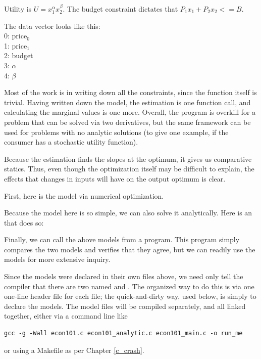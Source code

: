 Utility is $U = x_1^\alpha x_2^\beta$. 
The budget constraint dictates that $P_1 x_1 + P_2 x_2 <= B$.
                                                             
The data vector looks like this:\\
0:  price$_0$\\
1:  price$_1$\\
2:  budget \\
3:  $\alpha$  \\
4:  $\beta$   
                                                             
Most of the work is in writing down all the constraints, since the
function itself is trivial. Having written down the model, the estimation
is one function call, and calculating the marginal values is one more.
Overall, the program is overkill for a problem that can be solved via
two derivatives, but the same framework can be used for problems with no
analytic solutions (to give one example, if the consumer has a stochastic
utility function).

Because the estimation finds the slopes at the optimum, it gives us
comparative statics. Thus, even though the optimization itself may be
difficult to explain, the effects that changes in inputs will have on
the output optimum is clear.

First, here is the model via numerical optimization.


Because the model here is so simple, we can also solve it analytically.
Here is an  that does so:


Finally, we can call the above models from a program. This program
simply compares the two models and verifies that they agree, but we can
readily use the models for more extensive inquiry.


Since the models were declared in their own files above, we need only
tell the compiler that there are two  named
 and 
. The organized way to do this is via one one-line
header file for each  file; the quick-and-dirty way, used below,
is simply to declare the models. The model files will be compiled
separately, and all linked together, either via a command line like
\begin{lstlisting}
gcc -g -Wall econ101.c econ101_analytic.c econ101_main.c -o run_me
\end{lstlisting}
or using a Makefile as per Chapter \ref{c_crash}.


